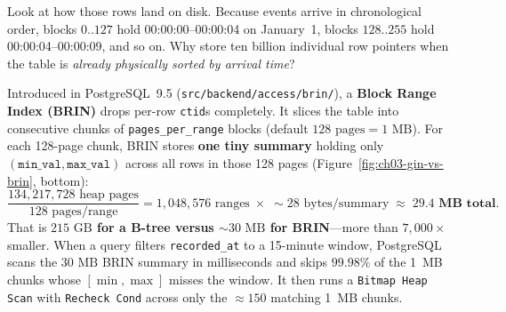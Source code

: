Look at how those rows land on disk. Because events arrive in chronological order, blocks $0..127$ hold 00:00:00--00:00:04 on January~1, blocks $128..255$ hold 00:00:04--00:00:09, and so on. Why store ten billion individual row pointers when the table is \emph{already physically sorted by arrival time}?

Introduced in PostgreSQL~9.5 (\texttt{src/backend/access/brin/}), a \textbf{Block Range Index (BRIN)} drops per-row \texttt{ctid}s completely. It slices the table into consecutive chunks of \texttt{pages\_per\_range} blocks (default $128\text{ pages} = 1\text{ MB}$). For each 128-page chunk, BRIN stores \textbf{one tiny summary} holding only $(\texttt{min\_val}, \texttt{max\_val})$ across all rows in those 128 pages (Figure~\ref{fig:ch03-gin-vs-brin}, bottom):
\[
  \frac{134{,}217{,}728\text{ heap pages}}{128\text{ pages/range}} = 1{,}048{,}576\text{ ranges} \;\times\; \sim 28\text{ bytes/summary} \;\approx\; \mathbf{29.4\text{ MB total.}}
\]
That is \textbf{$215\text{ GB}$ for a B-tree versus $\sim 30\text{ MB}$ for BRIN}---more than $7{,}000\times$ smaller. When a query filters \texttt{recorded\_at} to a 15-minute window, PostgreSQL scans the $30\text{ MB}$ BRIN summary in milliseconds and skips $99.98\%$ of the 1~MB chunks whose $[\min, \max]$ misses the window. It then runs a \texttt{Bitmap Heap Scan} with \texttt{Recheck Cond} across only the $\approx 150$ matching 1~MB chunks.

